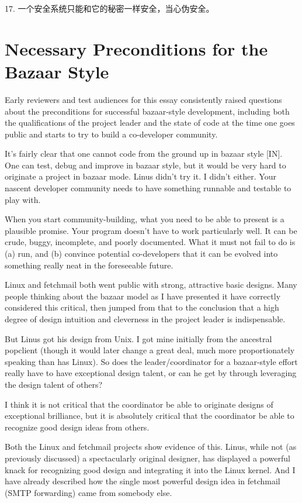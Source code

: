 \documentclass[a4paper,12pt,UTF8,twoside]{ctexbook}
\begin{document}
17. 一个安全系统只能和它的秘密一样安全，当心伪安全。

\chapter{Necessary Preconditions for the Bazaar Style}

Early reviewers and test audiences for this essay consistently raised questions about the preconditions for successful bazaar-style development, including both the qualifications of the project leader and the state of code at the time one goes public and starts to try to build a co-developer community.

It's fairly clear that one cannot code from the ground up in bazaar style [IN]. One can test, debug and improve in bazaar style, but it would be very hard to originate a project in bazaar mode. Linus didn't try it. I didn't either. Your nascent developer community needs to have something runnable and testable to play with.

When you start community-building, what you need to be able to present is a plausible promise. Your program doesn't have to work particularly well. It can be crude, buggy, incomplete, and poorly documented. What it must not fail to do is (a) run, and (b) convince potential co-developers that it can be evolved into something really neat in the foreseeable future.

Linux and fetchmail both went public with strong, attractive basic designs. Many people thinking about the bazaar model as I have presented it have correctly considered this critical, then jumped from that to the conclusion that a high degree of design intuition and cleverness in the project leader is indispensable.

But Linus got his design from Unix. I got mine initially from the ancestral popclient (though it would later change a great deal, much more proportionately speaking than has Linux). So does the leader/coordinator for a bazaar-style effort really have to have exceptional design talent, or can he get by through leveraging the design talent of others?

I think it is not critical that the coordinator be able to originate designs of exceptional brilliance, but it is absolutely critical that the coordinator be able to recognize good design ideas from others.

Both the Linux and fetchmail projects show evidence of this. Linus, while not (as previously discussed) a spectacularly original designer, has displayed a powerful knack for recognizing good design and integrating it into the Linux kernel. And I have already described how the single most powerful design idea in fetchmail (SMTP forwarding) came from somebody else.
\end{document}
